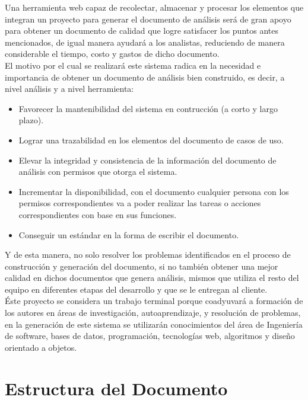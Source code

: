 Una herramienta web capaz de recolectar, almacenar y procesar los elementos que integran un proyecto para generar el documento de análisis será de gran apoyo para obtener un documento de calidad que logre satisfacer los puntos antes mencionados, de igual manera ayudará a los analistas, reduciendo de manera considerable el tiempo, costo y gastos de dicho documento.\\

El motivo por el cual se realizará este sistema radica en la necesidad e importancia de obtener un documento de análisis bien construido, es decir, a nivel análisis y a nivel herramienta:

\begin{itemize}
\item Favorecer la mantenibilidad del sistema en contrucción (a corto y largo plazo).
\item Lograr una trazabilidad en los elementos del documento de casos de uso.
\item Elevar la integridad y consistencia de la información del documento de análisis con permisos que otorga el sistema.
\item Incrementar la disponibilidad, con el documento cualquier persona con los permisos correspondientes va a poder realizar las tareas o acciones  correspondientes con base en sus funciones.
\item Conseguir un estándar en la forma de escribir el documento.
\end{itemize}

Y de esta manera, no solo resolver los problemas identificados en el proceso de construcción y generación del documento, si no también obtener una mejor calidad en dichos documentos que genera análisis, mismos que utiliza el resto del equipo en diferentes etapas del desarrollo y que se le entregan al cliente.\\

Éste proyecto se considera un trabajo terminal porque coadyuvará a formación de los autores en áreas de investigación, autoaprendizaje, y resolución de problemas,  en la generación de este sistema se utilizarán conocimientos del área de Ingeniería de software, bases de datos, programación, tecnologías web, algoritmos y diseño orientado a objetos.

\section{Estructura del Documento}

